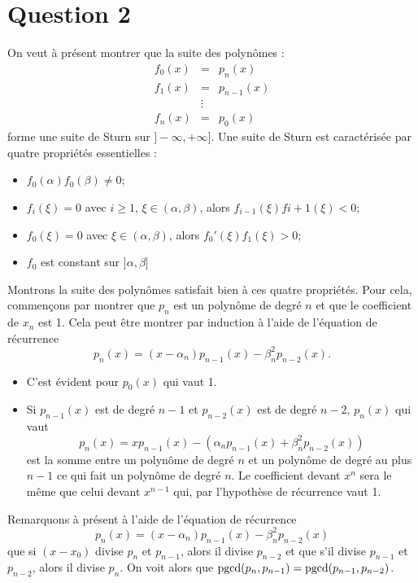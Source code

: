 \section*{Question 2}
On veut à présent montrer que la suite des polynômes : 
$$
\begin{array}{ccc}
f_0(x) & = & p_n(x)\\
f_1(x) & = & p_{n-1}(x)\\
&\vdots &\\
f_n(x) & = & p_0(x)
\end{array}
$$
forme une suite de Sturn sur $] - \infty, +\infty]$. Une suite de Sturn est caractérisée par quatre propriétés essentielles : 
\begin{itemize}
\item $f_0(\alpha) f_0(\beta) \neq 0$;
\item $f_i( \xi)=0$ avec $i \geq 1$, $\xi \in (\alpha, \beta)$, alors $f_{i-1}( \xi) f{i+1}( \xi) <0$;
\item $f_0( \xi )=0 $ avec $\xi \in (\alpha, \beta)$, alors $f_0'( \xi ) f_1( \xi ) >0$;
\item $f_0$ est constant sur $] \alpha, \beta]$
\end{itemize}
Montrons la suite des polynômes satisfait bien à ces quatre propriétés. Pour cela, commençons par montrer que $p_n$ est un polynôme de degré $n$ et que le
coefficient de $x_n$ est 1.
Cela peut être montrer par induction à l'aide de l'équation de récurrence
\begin{equation}\label{equ_recur}
p_n(x) = (x - \alpha_n)p_{n-1}(x) - \beta_n^2p_{n-2}(x).
\end{equation}

\begin{itemize}
  \item C'est évident pour $p_0(x)$ qui vaut 1.
  \item Si $p_{n-1}(x)$ est de degré $n-1$ et $p_{n-2}(x)$ est de degré
    $n-2$, $p_n(x)$ qui vaut
    \[ p_n(x) = xp_{n-1}(x) - (\alpha_np_{n-1}(x) + \beta_n^2p_{n-2}(x)) \]
    est la somme entre un polynôme de degré $n$ et un polynôme de
    degré au plus $n-1$ ce qui fait un polynôme de degré $n$.
    Le coefficient devant $x^n$ sera le même que celui devant $x^{n-1}$ qui,
    par l'hypothèse de récurrence vaut 1.
\end{itemize}


Remarquons à présent à l'aide de l'équation de récurrence
\[ p_n(x) = (x - \alpha_n)p_{n-1}(x) - \beta_n^2p_{n-2}(x) \]
que si $(x-x_0)$ divise $p_n$ et $p_{n-1}$, alors il divise
$p_{n-2}$ et que s'il divise $p_{n-1}$ et $p_{n-2}$, alors il divise $p_n$.
On voit alors que $\operatorname{pgcd}(p_n, p_{n-1}) = \operatorname{pgcd}(p_{n-1}, p_{n-2})$.



